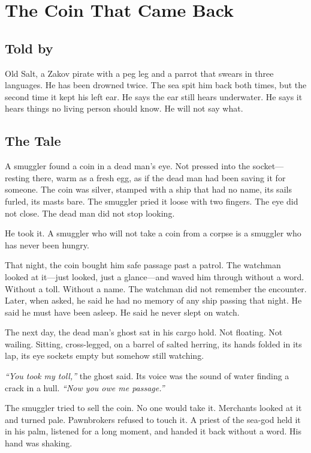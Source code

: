 \chapter{The Coin That Came Back}

\section*{Told by}
Old Salt, a Zakov pirate with a peg leg and a parrot that swears in three languages. He has been drowned twice. The sea spit him back both times, but the second time it kept his left ear. He says the ear still hears underwater. He says it hears things no living person should know. He will not say what.

\section*{The Tale}

A smuggler found a coin in a dead man's eye. Not pressed into the socket---resting there, warm as a fresh egg, as if the dead man had been saving it for someone. The coin was silver, stamped with a ship that had no name, its sails furled, its masts bare. The smuggler pried it loose with two fingers. The eye did not close. The dead man did not stop looking.

He took it. A smuggler who will not take a coin from a corpse is a smuggler who has never been hungry.

That night, the coin bought him safe passage past a patrol. The watchman looked at it---just looked, just a glance---and waved him through without a word. Without a toll. Without a name. The watchman did not remember the encounter. Later, when asked, he said he had no memory of any ship passing that night. He said he must have been asleep. He said he never slept on watch.

The next day, the dead man's ghost sat in his cargo hold. Not floating. Not wailing. Sitting, cross-legged, on a barrel of salted herring, its hands folded in its lap, its eye sockets empty but somehow still watching.

\textit{``You took my toll,''} the ghost said. Its voice was the sound of water finding a crack in a hull. \textit{``Now you owe me passage.''}

The smuggler tried to sell the coin. No one would take it. Merchants looked at it and turned pale. Pawnbrokers refused to touch it. A priest of the sea-god held it in his palm, listened for a long moment, and handed it back without a word. His hand was shaking.

